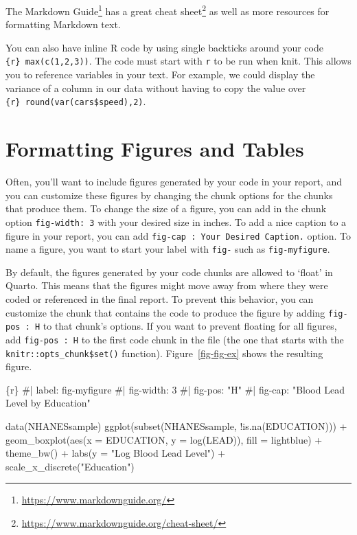 \documentclass[
  letterpaper,
]{latex/krantz}
\makeatletter
\newenvironment{Shaded}{\begin{snugshade}}{\end{snugshade}}
\newcommand{\InformationTok}[1]{\textcolor[rgb]{0.37,0.37,0.37}{#1}}
\renewcommand{\href}[2]{#2\footnote{\url{#1}}}
\newenvironment{kframe}{%
\medskip{}
\setlength{\fboxsep}{.8em}
 \def\at@end@of@kframe{}%
 \ifinner\ifhmode%
  \def\at@end@of@kframe{\end{minipage}}%
  \begin{minipage}{\columnwidth}%
 \fi\fi%
 \def\FrameCommand##1{\hskip\@totalleftmargin \hskip-\fboxsep
 \colorbox{shadecolor}{##1}\hskip-\fboxsep
     \hskip-\linewidth \hskip-\@totalleftmargin \hskip\columnwidth}%
 \MakeFramed {\advance\hsize-\width
   \@totalleftmargin\z@ \linewidth\hsize
   \@setminipage}}%
 {\par\unskip\endMakeFramed%
 \at@end@of@kframe}
\renewenvironment{Shaded}{\begin{kframe}}{\end{kframe}}
\makeatother
\begin{document}
\href{https://www.markdownguide.org/}{The Markdown Guide} has a great
\href{https://www.markdownguide.org/cheat-sheet/}{cheat sheet} as well
as more resources for formatting Markdown text.

You can also have inline R code by using single backticks around your
code \texttt{\textasciigrave{}\{r\}\ max(c(1,2,3))\textasciigrave{}}.
The code must start with \texttt{r} to be run when knit. This allows you
to reference variables in your text. For example, we could display the
variance of a column in our data without having to copy the value over
\texttt{\textasciigrave{}\{r\}\ round(var(cars\$speed),2)\textasciigrave{}}.

\section{\texorpdfstring{Formatting Figures and Tables
}{Formatting Figures and Tables  }}\label{formatting-figures-and-tables}

Often, you'll want to include figures generated by your code in your
report, and you can customize these figures by changing the chunk
options for the chunks that produce them. To change the size of a
figure, you can add in the chunk option \texttt{fig-width:\ 3} with your
desired size in inches. To add a nice caption to a figure in your
report, you can add
\texttt{fig-cap\ :\ \textquotesingle{}Your\ Desired\ Caption.\textquotesingle{}}
option. To name a figure, you want to start your label with
\texttt{fig-} such as \texttt{fig-myfigure}.

By default, the figures generated by your code chunks are allowed to
`float' in Quarto. This means that the figures might move away from
where they were coded or referenced in the final report. To prevent this
behavior, you can customize the chunk that contains the code to produce
the figure by adding
\texttt{fig-pos\ :\ \textquotesingle{}H\textquotesingle{}} to that
chunk's options. If you want to prevent floating for all figures, add
\texttt{fig-pos\ :\ \textquotesingle{}H\textquotesingle{}} to the first
code chunk in the file (the one that starts with the
\texttt{knitr::opts\_chunk\$set()} function). Figure~\ref{fig-fig-ex}
shows the resulting figure.

\begin{Shaded}
\begin{Highlighting}[]
  \InformationTok{\textasciigrave{}\textasciigrave{}\textasciigrave{}\{r\}}
\InformationTok{  \#| label: fig{-}myfigure}
\InformationTok{  \#| fig{-}width: 3}
\InformationTok{  \#| fig{-}pos: "H"}
\InformationTok{  \#| fig{-}cap: "Blood Lead Level by Education"}

\InformationTok{  data(NHANESsample)}
\InformationTok{  ggplot(subset(NHANESsample, !is.na(EDUCATION))) + }
\InformationTok{  geom\_boxplot(aes(x = EDUCATION, y = log(LEAD)), fill = \textquotesingle{}lightblue\textquotesingle{}) +}
\InformationTok{  theme\_bw() + }
\InformationTok{  labs(y = "Log Blood Lead Level") + }
\InformationTok{  scale\_x\_discrete("Education")}
\InformationTok{  \textasciigrave{}\textasciigrave{}\textasciigrave{}}
\end{Highlighting}
\end{Shaded}
\end{document}
